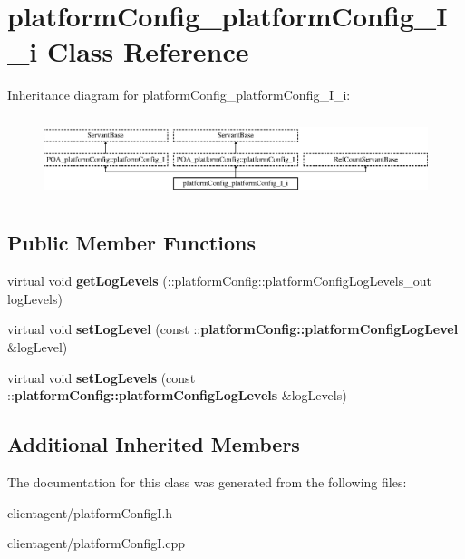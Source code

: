 \section{platform\+Config\+\_\+platform\+Config\+\_\+\+I\+\_\+i Class Reference}
\label{classplatformConfig__platformConfig__I__i}
Inheritance diagram for platform\+Config\+\_\+platform\+Config\+\_\+\+I\+\_\+i\+:\begin{figure}[H]
\begin{center}
\leavevmode
\includegraphics[height=2.393162cm]{classplatformConfig__platformConfig__I__i}
\end{center}
\end{figure}
\subsection*{Public Member Functions}
\begin{DoxyCompactItemize}
\item 
virtual void {\bfseries get\+Log\+Levels} (\+::platform\+Config\+::platform\+Config\+Log\+Levels\+\_\+out log\+Levels)\label{classplatformConfig__platformConfig__I__i_a424c366f04cc3f6aaf7e4c7e77761436}

\item 
virtual void {\bfseries set\+Log\+Level} (const \+::{\bf platform\+Config\+::platform\+Config\+Log\+Level} \&log\+Level)\label{classplatformConfig__platformConfig__I__i_aebb07df3feb87fff89d7cdea94b38cdb}

\item 
virtual void {\bfseries set\+Log\+Levels} (const \+::{\bf platform\+Config\+::platform\+Config\+Log\+Levels} \&log\+Levels)\label{classplatformConfig__platformConfig__I__i_a3e421c38c90f22364ce0ad6b647bc14a}

\end{DoxyCompactItemize}
\subsection*{Additional Inherited Members}


The documentation for this class was generated from the following files\+:\begin{DoxyCompactItemize}
\item 
clientagent/platform\+Config\+I.\+h\item 
clientagent/platform\+Config\+I.\+cpp\end{DoxyCompactItemize}

